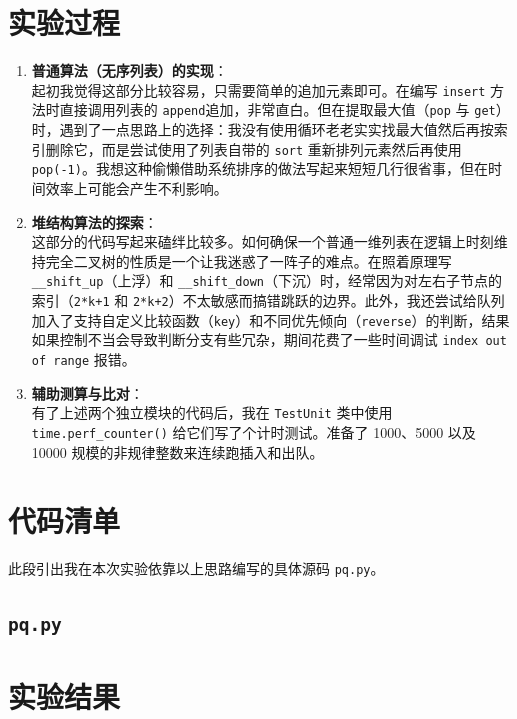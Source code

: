 \documentclass[12pt,a4paper]{ctexart}
\begin{document}
	\section{实验过程}
	\begin{enumerate}
		\item \textbf{普通算法（无序列表）的实现}：\\
		起初我觉得这部分比较容易，只需要简单的追加元素即可。在编写 \texttt{insert} 方法时直接调用列表的 \texttt{append}追加，非常直白。但在提取最大值（\texttt{pop} 与 \texttt{get}）时，遇到了一点思路上的选择：我没有使用循环老老实实找最大值然后再按索引删除它，而是尝试使用了列表自带的 \texttt{sort} 重新排列元素然后再使用 \texttt{pop(-1)}。我想这种偷懒借助系统排序的做法写起来短短几行很省事，但在时间效率上可能会产生不利影响。
		
		\item \textbf{堆结构算法的探索}：\\
		这部分的代码写起来磕绊比较多。如何确保一个普通一维列表在逻辑上时刻维持完全二叉树的性质是一个让我迷惑了一阵子的难点。在照着原理写 \texttt{\_\_shift\_up}（上浮）和 \texttt{\_\_shift\_down}（下沉）时，经常因为对左右子节点的索引（\texttt{2*k+1} 和 \texttt{2*k+2}）不太敏感而搞错跳跃的边界。此外，我还尝试给队列加入了支持自定义比较函数（\texttt{key}）和不同优先倾向（\texttt{reverse}）的判断，结果如果控制不当会导致判断分支有些冗杂，期间花费了一些时间调试 \texttt{index out of range} 报错。
		
		\item \textbf{辅助测算与比对}：\\
		有了上述两个独立模块的代码后，我在 \texttt{TestUnit} 类中使用 \texttt{time.perf\_counter()} 给它们写了个计时测试。准备了 1000、5000 以及 10000 规模的非规律整数来连续跑插入和出队。
	\end{enumerate}
	
	\section{代码清单}
	此段引出我在本次实验依靠以上思路编写的具体源码 \texttt{pq.py}。
	
	\subsection{\texttt{pq.py}}
	
	
	\section{实验结果}
	
\end{document}
